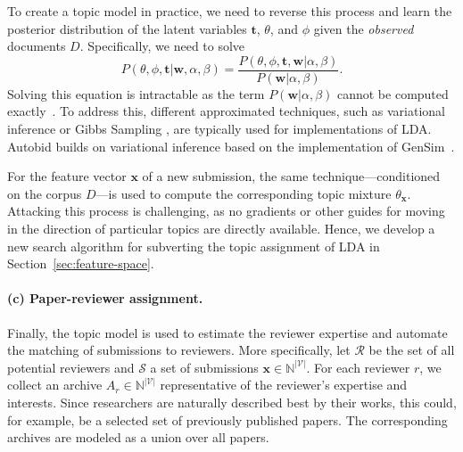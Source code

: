 \documentclass[letterpaper,twocolumn,10pt]{article}
\newcommand{\bow}{\textbf{x}}
\newcommand{\vocabulary}{\mathcal{V}}
\newcommand{\corpus}{D}
\newcommand{\corpusdoc}{\bow}
\newcommand{\topicwordprior}{\beta}
\newcommand{\topicdocumentprior}{\alpha}
\newcommand{\submission}{\bow}
\newcommand{\submissions}{\mathcal{S}}
\newcommand{\reviewersset}{\mathcal{R}}
\newcommand{\reviewer}{r}
\newcommand{\archive}{A}
\newcommand{\topic}{t}
\newcommand{\topicworddist}{\phi}
\newcommand{\topicdocumentdist}{\theta}
\newcommand{\word}{w}
\newcommand{\prob}{P}
\begin{document}
To create a topic model in practice, we need to reverse this process and learn the posterior distribution of the latent variables $\mathbf{\topic}$, $\topicdocumentdist$, and $\topicworddist$ given the \emph{observed} documents $\corpus$. Specifically, we need to solve
\begin{equation}
    \prob(\topicdocumentdist, \topicworddist, \mathbf{\topic}|\mathbf{\word}, \topicdocumentprior, \topicwordprior) = \frac{\prob(\topicdocumentdist, \topicworddist, \mathbf{\topic}, \mathbf{\word}|\topicdocumentprior, \topicwordprior)}{\prob(\mathbf{\word}|\topicdocumentprior, \topicwordprior)}.
\end{equation}
Solving this equation is intractable as the  term $\prob(\mathbf{\word}|\topicdocumentprior, \topicwordprior)$ cannot be computed exactly~\cite{blei-02-lda}. To address this, different approximated techniques, such as variational inference \cite{blei-02-lda, hoffman-10-online} or Gibbs Sampling \cite{darling-11-theoretical}, are typically used for implementations of \ac{LDA}. 
Autobid builds on variational inference based on the implementation of GenSim~\cite{rehurek-10-gensim}.

For the feature vector $\corpusdoc$ of a new submission, the same technique---conditioned on the corpus $\corpus$---is used to compute the corresponding topic mixture $\topicdocumentdist_\corpusdoc$. Attacking this process is challenging, as no gradients or other guides for moving in the direction of particular topics are directly available. Hence, we develop a new search algorithm for subverting the topic assignment of \ac{LDA} in Section~\ref{sec:feature-space}.

\paragraph{(c) Paper-reviewer assignment.}
\label{sec:background:assignment}
Finally, the topic model is used to estimate the reviewer expertise and automate the matching of submissions to reviewers. More specifically, let $\reviewersset$ be the set of all potential reviewers and $\submissions$ a set of submissions $\submission \in \mathbb{N}^{|\vocabulary|}$. For each reviewer $\reviewer$, we collect an archive $\archive_\reviewer \in \mathbb{N}^{|\vocabulary|}$ representative of the reviewer's expertise and interests. Since researchers are naturally described best by their works, this could, for example, be a selected set of previously published papers. The corresponding archives are modeled as a union over all papers.
\end{document}

